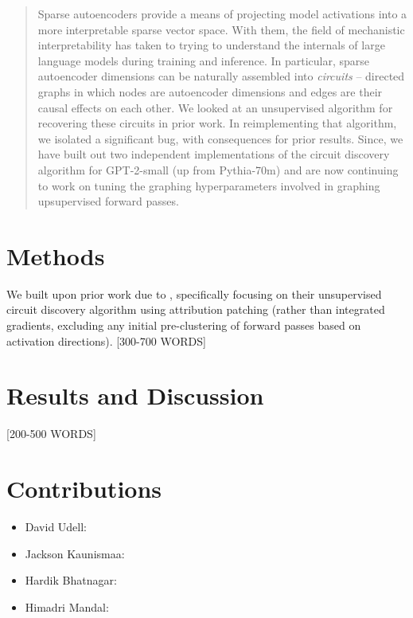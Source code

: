 \documentclass[10pt]{article}
\begin{document}

\printAffiliationsAndNotice{}

\begin{abstract}
Sparse autoencoders provide a means of projecting model activations into a more interpretable sparse vector space. With them, the field of mechanistic interpretability has taken to trying to understand the internals of large language models during training and inference. In particular, sparse autoencoder dimensions can be naturally assembled into \textit{circuits} -- directed graphs in which nodes are autoencoder dimensions and edges are their causal effects on each other. We looked at an unsupervised algorithm for recovering these circuits in prior work. In reimplementing that algorithm, we isolated a significant bug, with consequences for prior results. Since, we have built out two independent implementations of the circuit discovery algorithm for GPT-2-small (up from Pythia-70m) and are now continuing to work on tuning the graphing hyperparameters involved in graphing upsupervised forward passes.
\end{abstract}

\section{Methods}
We built upon prior work due to \citet{Marks2024}, specifically focusing on their unsupervised circuit discovery algorithm using attribution patching (rather than integrated gradients, excluding any initial pre-clustering of forward passes based on activation directions). [300-700 WORDS]

\section{Results and Discussion}
[200-500 WORDS]


\section*{Contributions}
\begin{itemize}
\item David Udell:
\item Jackson Kaunismaa:
\item Hardik Bhatnagar:
\item Himadri Mandal:
\end{itemize}



\end{document}
